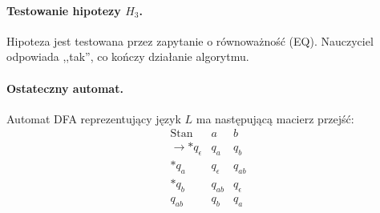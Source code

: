 \paragraph*{Testowanie hipotezy $H_3$.}
Hipoteza jest testowana przez zapytanie o równoważność (EQ). Nauczyciel odpowiada ,,tak'', co kończy działanie algorytmu.

\paragraph*{Ostateczny automat.}
Automat DFA reprezentujący język \( L \) ma następującą macierz przejść:
\[
\begin{array}{c|c|c}
\text{Stan} & a & b \\
\hline
\rightarrow * q_\epsilon & q_a & q_b \\
* q_a & q_\epsilon & q_{ab} \\
* q_b & q_{ab} & q_\epsilon \\
q_{ab} & q_b & q_a \\
\end{array}
\]
